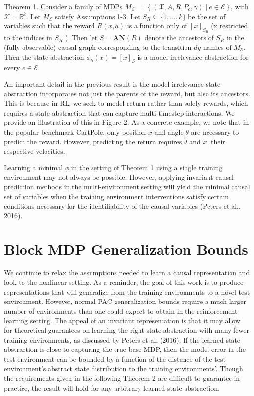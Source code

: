 \documentclass[10pt]{article}
\begin{document}
Theorem 1. Consider a family of MDPs $M_{\mathcal{E}}=$ $\left\{\left(\mathcal{X}, A, R, P_{e}, \gamma\right) \mid e \in \mathcal{E}\right\}$, with $\mathcal{X}=\mathbb{R}^{k}$. Let $M_{\mathcal{E}}$ satisfy Assumptions 1-3. Let $S_{R} \subseteq\{1, \ldots, k\}$ be the set of variables such that the reward $R(x, a)$ is a function only of $[x]_{S_{R}}$ (x restricted to the indices in $S_{R}$ ). Then let $S=\boldsymbol{A N}(R)$ denote the ancestors of $S_{R}$ in the (fully observable) causal graph corresponding to the transition $d y$ namics of $M_{\mathcal{E}}$. Then the state abstraction $\phi_{S}(x)=[x]_{S}$ is a model-irrelevance abstraction for every $e \in \mathcal{E}$.

An important detail in the previous result is the model irrelevance state abstraction incorporates not just the parents of the reward, but also its ancestors. This is because in RL, we seek to model return rather than solely rewards, which requires a state abstraction that can capture multi-timestep interactions. We provide an illustration of this in Figure 2. As a concrete example, we note that in the popular benchmark CartPole, only position $x$ and angle $\theta$ are necessary to predict the reward. However, predicting the return requires $\dot{\theta}$ and $\dot{x}$, their respective velocities.

Learning a minimal $\phi$ in the setting of Theorem 1 using a single training environment may not always be possible. However, applying invariant causal prediction methods in the multi-environment setting will yield the minimal causal set of variables when the training environment interventions satisfy certain conditions necessary for the identifiability of the causal variables (Peters et al., 2016).

\section{Block MDP Generalization Bounds}
We continue to relax the assumptions needed to learn a causal representation and look to the nonlinear setting. As a reminder, the goal of this work is to produce representations that will generalize from the training environments to a novel test environment. However, normal PAC generalization bounds require a much larger number of environments than one could expect to obtain in the reinforcement learning setting. The appeal of an invariant representation is that it may allow for theoretical guarantees on learning the right state abstraction with many fewer training environments, as discussed by Peters et al. (2016). If the learned state abstraction is close to capturing the true base MDP, then the model error in the test environment can be bounded by a function of the distance of the test environment's abstract state distribution to the training environments'. Though the requirements given in the following Theorem 2 are difficult to guarantee in practice, the result will hold for any arbitrary learned state abstraction.
\end{document}
